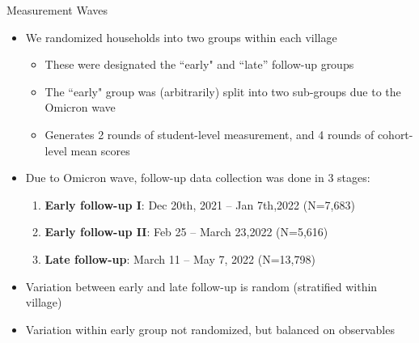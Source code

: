 \documentclass[aspectratio=169,numbering=none]{beamer}
\begin{document}
\begin{frame}[plain,label=timing]{Measurement Waves}
\begin{itemize}
\vfill\item We randomized households into two groups within each village \hyperlink{balance_app}{}
\begin{itemize}
   \vfill \item These were designated the ``early" and ``late'' follow-up groups
   \vfill \item The ``early" group was (arbitrarily) split into two sub-groups due to the Omicron wave 
   \vfill \item Generates 2 rounds of student-level measurement, and 4 rounds of cohort-level mean scores  
\end{itemize}
\vfill\item Due to Omicron wave, follow-up data collection was done in 3 stages:
\begin{enumerate}
\vfill\item \textbf{Early follow-up I}: Dec 20th, 2021 -- Jan 7th,2022 (N=7,683)
\vfill\item \textbf{Early follow-up II}: Feb 25 -- March 23,2022 (N=5,616)
\vfill\item \textbf{Late follow-up}: March 11 -- May 7, 2022 (N=13,798)
\end{enumerate}
\vfill\item Variation between early and late follow-up is random (stratified within village)
\vfill \item Variation within early group not randomized, but balanced on observables
\end{itemize}
\end{frame}
\end{document}
